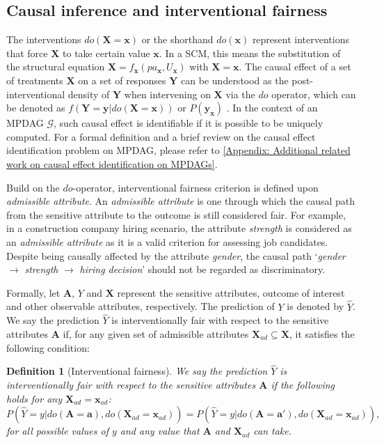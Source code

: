 \documentclass{article} %
\newtheorem{definition}{Definition}[section]
\begin{document}
\subsection{Causal inference and interventional fairness}
The interventions $do(\mathbf{X} = \mathbf{x})$ or the shorthand $do(\mathbf{x})$ represent interventions that force $\mathbf{X}$ to take certain value $\mathbf{x}$. In a SCM, this means the substitution of the structural equation $\mathbf{X}=f_{\mathbf{x}}(pa_{\mathbf{x}}, U_{\mathbf{x}})$ with $\mathbf{X}=\mathbf{x}$. The causal effect of a set of treatments $\mathbf{X}$ on a set of responses $\mathbf{Y}$ can be understood as the post-interventional density of $\mathbf{Y}$ when intervening on $\mathbf{X}$ via the $do$ operator, which can be denoted as $f(\mathbf{Y}=\mathbf{y}|do(\mathbf{X}=\mathbf{x}))$ or $P(\mathbf{y}_\mathbf{x})$ \cite{pearl1995causal, pearl2009causality}. In the context of an MPDAG $\mathcal{G}$, such causal effect is identifiable if it is possible to be uniquely computed. For a formal definition and a brief review on the causal effect identification problem on MPDAG, please refer to \cref{Appendix: Additional related work on causal effect identification on MPDAGs}.

Build on the $do$-operator, interventional fairness criterion \citep{salimi2019interventional} is defined upon \textit{admissible attribute}. An \textit{admissible attribute} is one through which the causal path from the sensitive attribute to the outcome is still considered fair. For example, in a construction company hiring scenario, the attribute \textit{strength} is considered as an \textit{admissible attribute} as it is a valid criterion for assessing job candidates. Despite being causally affected by the attribute \textit{gender}, the causal path `\textit{gender} $\rightarrow$ \textit{strength} $\rightarrow$ \textit{hiring decision}' should not be regarded as discriminatory. 

Formally, let $\mathbf{A}$, $Y$ and $\mathbf{X}$ represent the sensitive attributes, outcome of interest and other observable attributes, respectively. The prediction of $Y$ is denoted by $\hat{Y}$. We say the prediction $\hat{Y}$ is interventionally fair with respect to the sensitive attributes $\mathbf{A}$ if, for any given set of admissible attributes $\mathbf{X}_{ad} \subseteq \mathbf{X}$, it satisfies the following condition:
\begin{definition}[Interventional fairness] \citep{salimi2019interventional} \label{def: interventional fairness}
We say the prediction $\hat{Y}$ is interventionally fair with respect to the sensitive attributes $\mathbf{A}$ if the following holds for any $\mathbf{X}_{ad}=\mathbf{x}_{ad}$:
    \begin{equation*}%
        P(\hat{Y}=y|do(\mathbf{A}=\mathbf{a}), do(\mathbf{X}_{ad}=\mathbf{x}_{ad}))=P(\hat{Y}=y|do(\mathbf{A}=\mathbf{a'}), do(\mathbf{X}_{ad}=\mathbf{x}_{ad})),   
    \end{equation*}
for all possible values of $y$ and any value that $\mathbf{A}$ and $\mathbf{X}_{ad}$ can take.
\end{definition}
\end{document}
